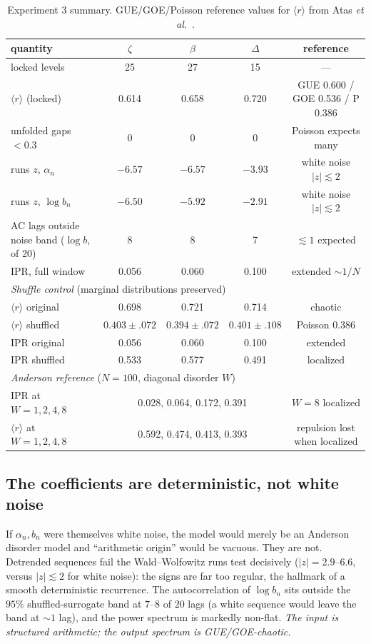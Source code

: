 \documentclass[aps,prx,reprint,floatfix]{revtex4-2}
\begin{document}
\begin{table}[t]
\centering
\small
\begin{tabular}{lcccc}
\toprule
quantity & $\zeta$ & $\beta$ & $\Delta$ & reference \\
\midrule
locked levels & 25 & 27 & 15 & --- \\
$\langle r\rangle$ (locked) & 0.614 & 0.658 & 0.720 & GUE 0.600 / GOE 0.536 / P 0.386 \\
unfolded gaps $<0.3$ & 0 & 0 & 0 & Poisson expects many \\
runs $z$, $\alpha_n$ & $-6.57$ & $-6.57$ & $-3.93$ & white noise $|z|\lesssim2$ \\
runs $z$, $\log b_n$ & $-6.50$ & $-5.92$ & $-2.91$ & white noise $|z|\lesssim2$ \\
AC lags outside noise band ($\log b$, of 20) & 8 & 8 & 7 & $\lesssim1$ expected \\
IPR, full window & 0.056 & 0.060 & 0.100 & extended $\sim 1/N$ \\
\midrule
\multicolumn{5}{l}{\emph{Shuffle control} (marginal distributions preserved)}\\
$\langle r\rangle$ original & 0.698 & 0.721 & 0.714 & chaotic \\
$\langle r\rangle$ shuffled & $0.403\pm.072$ & $0.394\pm.072$ & $0.401\pm.108$ & Poisson 0.386 \\
IPR original & 0.056 & 0.060 & 0.100 & extended \\
IPR shuffled & 0.533 & 0.577 & 0.491 & localized \\
\midrule
\multicolumn{5}{l}{\emph{Anderson reference} ($N=100$, diagonal disorder $W$)}\\
IPR at $W=1,2,4,8$ & \multicolumn{3}{c}{0.028, 0.064, 0.172, 0.391} & $W=8$ localized \\
$\langle r\rangle$ at $W=1,2,4,8$ & \multicolumn{3}{c}{0.592, 0.474, 0.413, 0.393} & repulsion lost when localized\\
\bottomrule
\end{tabular}
\caption{Experiment 3 summary. GUE/GOE/Poisson reference values for
$\langle r\rangle$ from Atas \emph{et al.}~\cite{atas2013}.}
\label{tab:exp3}
\end{table}

\subsection{The coefficients are deterministic, not white noise}
\label{sec:e1}
If $\alpha_n,b_n$ were themselves white noise, the model would merely be an
Anderson disorder model and ``arithmetic origin'' would be vacuous. They are
not. Detrended sequences fail the Wald--Wolfowitz runs test decisively
($|z|=2.9$--$6.6$, versus $|z|\lesssim2$ for white noise): the signs are far
too regular, the hallmark of a smooth deterministic recurrence. The
autocorrelation of $\log b_n$ sits outside the $95\%$ shuffled-surrogate
band at $7$--$8$ of $20$ lags (a white sequence would leave the band at
$\sim1$ lag), and the power spectrum is markedly non-flat. \emph{The input
is structured arithmetic; the output spectrum is GUE/GOE-chaotic.}
\end{document}
